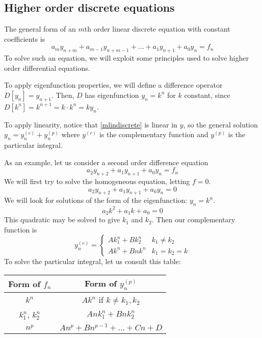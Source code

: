 \subsection{Higher order discrete equations}
The general form of an \(m\)th order linear discrete equation with constant coefficients is
\begin{equation}\label{mlindiscrete}
	a_m y_{n+m} + a_{m-1}y_{n+m-1} + \dots + a_1y_{n+1} + a_0y_n = f_n
\end{equation}
To solve such an equation, we will exploit some principles used to solve higher order differential equations.

To apply eigenfunction properties, we will define a difference operator \(D[y_n] = y_{n+1}\).
Then, \(D\) has eigenfunction \(y_n = k^n\) for \(k\) constant, since \(D[k^n] = k^{n+1} = k \cdot k^n = ky_n\).

To apply linearity, notice that \eqref{mlindiscrete} is linear in \(y\), so the general solution \(y_n = y_n^{(c)} + y_n^{(p)}\) where \(y^{(c)}\) is the complementary function and \(y^{(p)}\) is the particular integral.

As an example, let us consider a second order difference equation
\[
	a_2 y_{n+2} + a_1 y_{n+1} + a_0 y_n = f_n
\]
We will first try to solve the homogeneous equation, letting \(f=0\).
\[
	a_2 y_{n+2} + a_1 y_{n+1} + a_0 y_n = 0
\]
We will look for solutions of the form of the eigenfunction: \(y_n = k^n\).
\[
	a_2 k^2 + a_1 k + a_0 = 0
\]
This quadratic may be solved to give \(k_1\) and \(k_2\).
Then our complementary function is
\[
	y_n^{(c)} = \begin{cases}
		A k_1^n + B k_2^n & k_1 \neq k_2  \\
		A k^n + Bnk^n     & k_1 = k_2 = k
	\end{cases}
\]
To solve the particular integral, let us consult this table:

\begin{center}
	\begin{tabular}{cc}
		Form of \(f_n\)      & Form of \(y_n^{(p)}\)                \\\midrule
		\(k^n\)              & \(Ak^n\) if \(k \neq k_1, k_2\)      \\
		\(k_1^n\), \(k_2^n\) & \(Ank_1^n + Bnk_2^n\)                \\
		\(n^p\)              & \(An^p + Bn^{p-1} + \dots + Cn + D\)
	\end{tabular}
\end{center}

